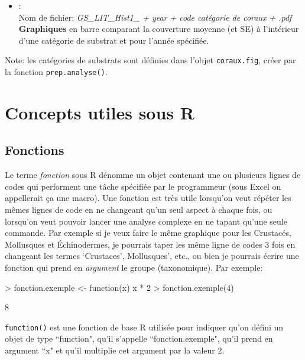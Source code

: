 \documentclass{article}
\begin{document}
\begin{itemize}
\item[] \hypertarget{l5}{}:\\
  Nom de fichier: \emph{GS\_LIT\_Hist1\_ + year + code catégorie de coraux
    + .pdf}\\
  \textbf{Graphiques} en barre comparant la
  couverture moyenne (et SE) à l'intérieur d'une catégorie de substrat
  et pour l'année spécifiée.

\end{itemize}

Note: les catégories de substrats sont définies dans l'objet
\texttt{coraux.fig}, créer par la fonction \texttt{prep.analyse()}.

\section{Concepts utiles sous R}
\subsection * {Fonctions}
Le terme \emph{fonction} sous R dénomme un objet contenant une ou plusieurs
lignes de codes qui performent une tâche spécifiée par le programmeur
(sous Excel on appellerait ça une macro). Une fonction
est très utile lorsqu'on veut répéter les mêmes lignes de code
en ne changeant qu'un seul aspect à chaque fois, ou lorsqu'on veut pouvoir
lancer une analyse complexe en ne tapant qu'une seule commande. Par exemple si je veux
faire le même graphique pour les Crustacés, Mollusques et
Échinodermes, je pourrais taper les même ligne de codes 3 fois en
changeant les termes `Crustaces', Mollusques', etc., ou bien je pourrais
écrire une fonction qui prend en \emph{argument} le groupe (taxonomique).
Par exemple:
\begin{Schunk}
\begin{Sinput}
> fonction.exemple <- function(x) x * 2
> fonction.exemple(4)
\end{Sinput}
\begin{Soutput}
[1] 8
\end{Soutput}
\end{Schunk}
\texttt{function()} est une fonction de base R utilisée pour
indiquer qu'on défini un objet de type ``function", qu'il s'appelle ``fonction.exemple",
qu'il prend en argument ``x" et qu'il multiplie cet argument par la
valeur 2.
\end{document}
